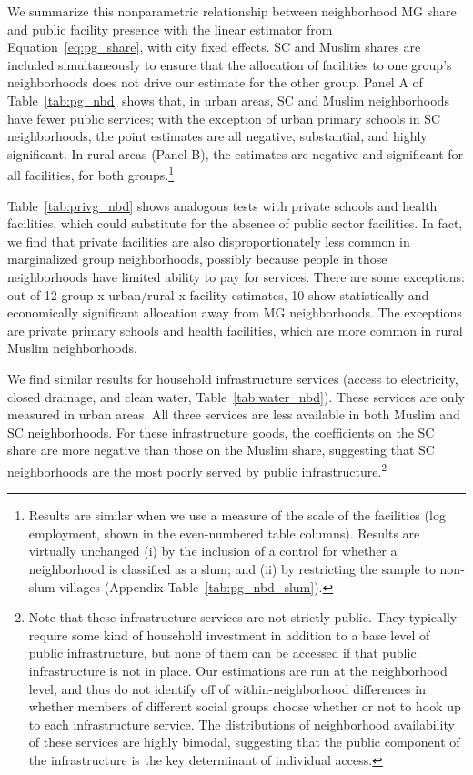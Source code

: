 \documentclass[12pt]{article}
\begin{document}
We summarize this nonparametric relationship between neighborhood MG share and public facility presence with the linear estimator from Equation~\ref{eq:pg_share}, with city fixed effects. SC and Muslim shares are included simultaneously to ensure that the allocation of facilities to one group's neighborhoods does not drive our estimate for the other group. Panel A of Table~\ref{tab:pg_nbd} shows that, in urban areas, SC and Muslim neighborhoods have fewer public services; with the exception of urban primary schools in SC neighborhoods, the point estimates are all negative, substantial, and highly significant. In rural areas (Panel B), the estimates are negative and significant for all facilities, for both groups.\footnote{Results are similar when we use a measure of the scale of the facilities (log employment, shown in the even-numbered table columns). Results are virtually unchanged (i) by the inclusion of a control for whether a neighborhood is classified as a slum; and (ii) by restricting the sample to non-slum villages (Appendix Table~\ref{tab:pg_nbd_slum}).}

Table~\ref{tab:privg_nbd} shows analogous tests with private schools and health facilities, which could substitute for the absence of public sector facilities. In fact, we find that private facilities are also disproportionately less common in marginalized group neighborhoods, possibly because people in those neighborhoods have limited ability to pay for services. There are some exceptions: out of 12 group x urban/rural x facility estimates, 10 show statistically and economically significant allocation away from MG neighborhoods. The exceptions are private primary schools and health facilities, which are more common in rural Muslim neighborhoods.

We find similar results for household infrastructure services (access to electricity, closed drainage, and clean water, Table~\ref{tab:water_nbd}). These services are only measured in urban areas. All three services are less available in both Muslim and SC neighborhoods. For these infrastructure goods, the coefficients on the SC share are more negative than those on the Muslim share, suggesting that SC neighborhoods are the most poorly served by public infrastructure.\footnote{Note that these infrastructure services are not strictly public. They typically require some kind of household investment in addition to a base level of public infrastructure, but none of them can be accessed if that public infrastructure is not in place. Our estimations are run at the neighborhood level, and thus do not identify off of within-neighborhood differences in whether members of different social groups choose whether or not to hook up to each infrastructure service. The distributions of neighborhood availability of these services are highly bimodal, suggesting that the public component of the infrastructure is the key determinant of individual access.} 
\end{document}
